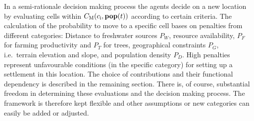In a semi-rationale decision making process the agents decide on a new location by evaluating cells within $C_{\rm M} (c_{\rm i}, \mathbf{pop}(t))$ according to certain criteria.
The calculation of the probability to move to a specific cell bases on penalties from different categories: Distance to freshwater sources $P_W$, resource availability, $P_F$ for farming productivity and $P_T$ for trees, geographical constraints $P_G$, i.e.\ terrain elevation and slope, and population density $P_D$.
High penalties represent unfavourable conditions (in the specific category) for setting up a settlement in this location.
The choice of contributions and their functional dependency is described in the remaining section.
There is, of course, substantial freedom in determining these evaluations and the decision making process.
The framework is therefore kept flexible and other assumptions or new categories can easily be added or adjusted.

